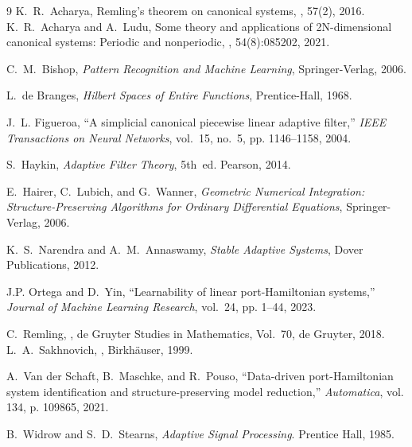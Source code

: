\documentclass[reqno]{amsart}
\numberwithin{equation}{section}
\begin{document}
\begin{thebibliography}{9}
K.~R.~Acharya,
\newblock Remling's theorem on canonical systems,
, 57(2), 2016.
 K.~R.~Acharya and A.~Ludu,
\newblock Some theory and applications of 2N-dimensional canonical systems: Periodic and nonperiodic,
, 54(8):085202, 2021.

C.~M.~Bishop,
\textit{Pattern Recognition and Machine Learning},
Springer-Verlag, 2006.

L.~de Branges,
\textit{Hilbert Spaces of Entire Functions},
Prentice-Hall, 1968.



J.~L. Figueroa, ``A simplicial canonical piecewise linear adaptive filter,'' \emph{IEEE Transactions on Neural Networks}, vol.~15, no.~5, pp. 1146--1158, 2004.


S.~Haykin, {\em Adaptive Filter Theory}, 5th~ed.
Pearson, 2014.

E.~Hairer, C.~Lubich, and G.~Wanner,
\textit{Geometric Numerical Integration: Structure-Preserving Algorithms for Ordinary Differential Equations},
Springer-Verlag, 2006.


K.~S.~Narendra and A.~M.~Annaswamy,
\textit{Stable Adaptive Systems},
Dover Publications, 2012.



J.P. Ortega and D.~Yin, ``Learnability of linear port-Hamiltonian systems,'' \emph{Journal of Machine Learning Research}, vol.~24, pp. 1--44, 2023.

C.~Remling,
,
\newblock de Gruyter Studies in Mathematics, Vol.~70, de Gruyter, 2018.
 L.~A.~Sakhnovich,
,
\newblock Birkhäuser, 1999.


A.~Van der Schaft, B.~Maschke, and R.~Pouso, ``Data-driven port-Hamiltonian system identification and structure-preserving model reduction,'' \emph{Automatica}, vol. 134, p. 109865, 2021.

B.~Widrow and S.~D.~Stearns, {\em Adaptive Signal Processing}.
Prentice Hall, 1985.

\end{thebibliography}
\end{document}
